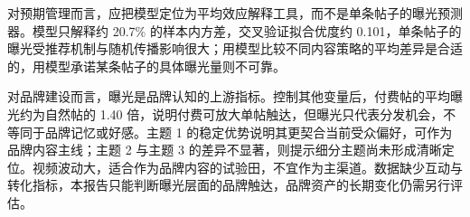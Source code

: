 对预期管理而言，应把模型定位为平均效应解释工具，而不是单条帖子的曝光预测器。模型只解释约 20.7\% 的样本内方差，交叉验证拟合优度约 0.101，单条帖子的曝光受推荐机制与随机传播影响很大；用模型比较不同内容策略的平均差异是合适的，用模型承诺某条帖子的具体曝光量则不可靠。

对品牌建设而言，曝光是品牌认知的上游指标。控制其他变量后，付费帖的平均曝光约为自然帖的 1.40 倍，说明付费可放大单帖触达，但曝光只代表分发机会，不等同于品牌记忆或好感。主题 1 的稳定优势说明其更契合当前受众偏好，可作为品牌内容主线；主题 2 与主题 3 的差异不显著，则提示细分主题尚未形成清晰定位。视频波动大，适合作为品牌内容的试验田，不宜作为主渠道。数据缺少互动与转化指标，本报告只能判断曝光层面的品牌触达，品牌资产的长期变化仍需另行评估。
